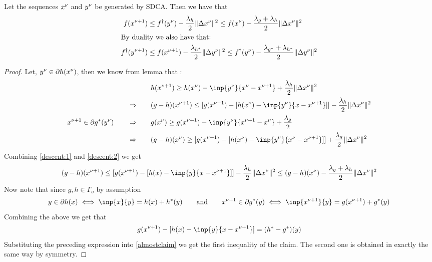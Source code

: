 \begin{theorem}
  Let the sequences $x^\nu$ and $y^{\nu}$ be generated by SDCA. Then we have  that
  \begin{align}
    f(x^{\nu+1}) &\leq f^\dagger (y^{\nu}) -\frac{\lambda_h}{2}\lVert\Delta x^\nu\rVert^2 
      \leq f(x^\nu) - \frac{\lambda_g + \lambda_h}{2}\lVert\Delta x^\nu\rVert^2\\
  \intertext{By duality we also have that:}
  f^\dagger(y^{\nu+1}) &\leq f (x^{\nu+1}) -\frac{\lambda_{h^*}}{2}\lVert\Delta y^{\nu}\rVert^2 
      \leq f^\dagger(y^{\nu}) - \frac{\lambda_{g^*} + \lambda_{h^*}}{2}\lVert\Delta y^{\nu}\rVert^2
  \end{align}
\begin{proof}
    Let,  $y^{\nu} \in\partial h(x^\nu)$, then we know from lemma that :
\begin{align}
  \nonumber  \qquad& h(\xss) \geq h(\xs) - \inp{\ys}{\xs-\xss} + \frac{\lambda_h}{2}\norm{\Delta \xs}^2\\
  \qquad \Rightarrow \qquad & (g-h)(\xss) \leq [g(\xss) - [h(\xs)-\inp{\ys}{x-\xss}]] - \frac{\lambda_h}{2}\norm{\Delta \xs}^2
  \label{descent:1}\\
  \xss\in\partial g^*(\ys) \qquad
  \nonumber \Rightarrow \qquad& g(\xs) \geq g(\xss) - \inp{\ys}{\xss-\xs} + \frac{\lambda_g}{2}\\
  \qquad \Rightarrow \qquad& (g-h)(\xs) \geq [g(\xss) - [h(\xs)-\inp{\ys}{\xs-\xss}]]+\frac{\lambda_g}{2}\norm{\Delta \xs}^2
  \label{descent:2}
\end{align}
Combining \eqref{descent:1} and \eqref{descent:2} we get 
\begin{equation}
  (g-h)(\xss) \leq [g(\xss) - [h(x)-\inp{y}{x-\xss}]]-\frac{\lambda_h}{2}\norm{\Delta \xs}^2
  \leq (g-h)(\xs) - \frac{\lambda_g + \lambda_h}{2}\norm{\Delta \xs}^2 \label{almostclaim}
\end{equation}
Now note that since $g,h\in \Gamma_o$ by assumption
\begin{equation}
  y\in\partial h(x) \iff \inp{x}{y}=h(x)+h^*(y) \qquad \text{and} \qquad 
  \xss\in\partial g^*(y) \iff \inp{\xss}{y}=g(\xss)+g^*(y)
\end{equation}
Combining the above we get that 
\begin{equation}
  g(\xss)-[h(x)-\inp{y}{x-\xss}]=(h^*-g^*)(y)
\end{equation}
Substituting the preceding expression into \eqref{almostclaim} we get the first inequality 
of the claim. The second one is obtained in exactly the same way by symmetry.
\end{proof}
\end{theorem}
\newpage

